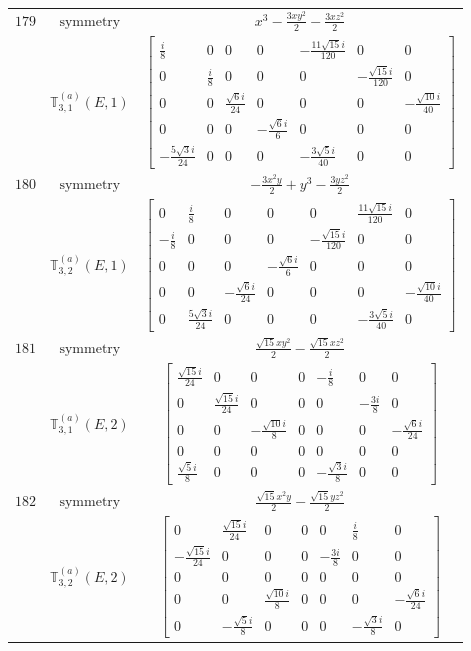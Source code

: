 \documentclass[fleqn,8pt,landscape]{jsarticle}
\begin{document}
\begin{longtable}{ccc}
$ 179 $ & $ \text{symmetry} $ & $ x^{3} - \frac{3 x y^{2}}{2} - \frac{3 x z^{2}}{2} $ \\
$  $ & $ \mathbb{T}_{3,1}^{(a)}(E,1) $ & $ \begin{bmatrix} \frac{i}{8} & 0 & 0 & 0 & - \frac{11 \sqrt{15} i}{120} & 0 & 0 \\ 0 & \frac{i}{8} & 0 & 0 & 0 & - \frac{\sqrt{15} i}{120} & 0 \\ 0 & 0 & \frac{\sqrt{6} i}{24} & 0 & 0 & 0 & - \frac{\sqrt{10} i}{40} \\ 0 & 0 & 0 & - \frac{\sqrt{6} i}{6} & 0 & 0 & 0 \\ - \frac{5 \sqrt{3} i}{24} & 0 & 0 & 0 & - \frac{3 \sqrt{5} i}{40} & 0 & 0 \end{bmatrix} $ \\ \hline
$ 180 $ & $ \text{symmetry} $ & $ - \frac{3 x^{2} y}{2} + y^{3} - \frac{3 y z^{2}}{2} $ \\
$  $ & $ \mathbb{T}_{3,2}^{(a)}(E,1) $ & $ \begin{bmatrix} 0 & \frac{i}{8} & 0 & 0 & 0 & \frac{11 \sqrt{15} i}{120} & 0 \\ - \frac{i}{8} & 0 & 0 & 0 & - \frac{\sqrt{15} i}{120} & 0 & 0 \\ 0 & 0 & 0 & - \frac{\sqrt{6} i}{6} & 0 & 0 & 0 \\ 0 & 0 & - \frac{\sqrt{6} i}{24} & 0 & 0 & 0 & - \frac{\sqrt{10} i}{40} \\ 0 & \frac{5 \sqrt{3} i}{24} & 0 & 0 & 0 & - \frac{3 \sqrt{5} i}{40} & 0 \end{bmatrix} $ \\ \hline
$ 181 $ & $ \text{symmetry} $ & $ \frac{\sqrt{15} x y^{2}}{2} - \frac{\sqrt{15} x z^{2}}{2} $ \\
$  $ & $ \mathbb{T}_{3,1}^{(a)}(E,2) $ & $ \begin{bmatrix} \frac{\sqrt{15} i}{24} & 0 & 0 & 0 & - \frac{i}{8} & 0 & 0 \\ 0 & \frac{\sqrt{15} i}{24} & 0 & 0 & 0 & - \frac{3 i}{8} & 0 \\ 0 & 0 & - \frac{\sqrt{10} i}{8} & 0 & 0 & 0 & - \frac{\sqrt{6} i}{24} \\ 0 & 0 & 0 & 0 & 0 & 0 & 0 \\ \frac{\sqrt{5} i}{8} & 0 & 0 & 0 & - \frac{\sqrt{3} i}{8} & 0 & 0 \end{bmatrix} $ \\ \hline
$ 182 $ & $ \text{symmetry} $ & $ \frac{\sqrt{15} x^{2} y}{2} - \frac{\sqrt{15} y z^{2}}{2} $ \\
$  $ & $ \mathbb{T}_{3,2}^{(a)}(E,2) $ & $ \begin{bmatrix} 0 & \frac{\sqrt{15} i}{24} & 0 & 0 & 0 & \frac{i}{8} & 0 \\ - \frac{\sqrt{15} i}{24} & 0 & 0 & 0 & - \frac{3 i}{8} & 0 & 0 \\ 0 & 0 & 0 & 0 & 0 & 0 & 0 \\ 0 & 0 & \frac{\sqrt{10} i}{8} & 0 & 0 & 0 & - \frac{\sqrt{6} i}{24} \\ 0 & - \frac{\sqrt{5} i}{8} & 0 & 0 & 0 & - \frac{\sqrt{3} i}{8} & 0 \end{bmatrix} $ \\ \hline

\end{longtable}
\end{document}
